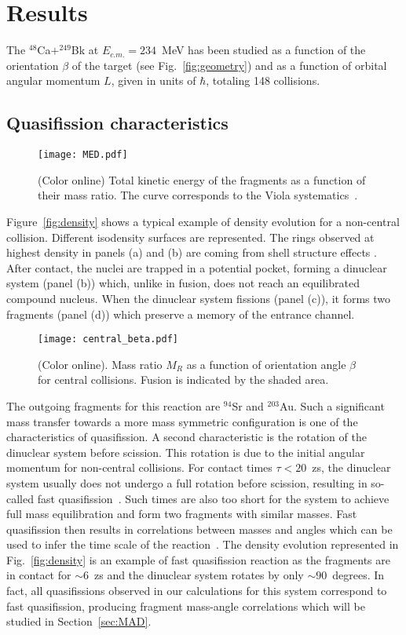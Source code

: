 \documentclass[reprint,aps,prc,twocolumn,floatfix,10pt]{revtex4-2}
\begin{document}
\section{Results}\label{sec:results}

The $^{48}$Ca$+^{249}$Bk at $E_{c.m.}=234$~MeV has been studied as a function of the orientation $\beta$ of the target (see Fig.~\ref{fig:geometry}) and as a function of orbital angular momentum $L$, given in units of $\hbar$, totaling 148 collisions.

\subsection{Quasifission characteristics}
\begin{figure}[!htb]
\texttt{[image: MED.pdf]}
\caption{\protect(Color online) Total kinetic energy of the fragments as a function of their mass ratio. The curve corresponds to the Viola systematics~\cite{viola1985,hinde1987}.}
\label{fig:MED}
\end{figure}

Figure~\ref{fig:density} shows a typical example of density evolution for a non-central collision.
Different isodensity surfaces are represented.
The rings observed at highest density in panels (a) and (b) are coming from shell structure effects \cite{simenel2012}.
After contact, the nuclei are trapped in a potential pocket, forming a dinuclear system (panel (b)) which, unlike in fusion, does not reach an equilibrated compound nucleus.
When the dinuclear system fissions (panel (c)), it forms two fragments (panel (d)) which preserve a memory of the entrance channel.
\begin{figure}[!htb]
\texttt{[image: central\_beta.pdf]}
\caption{\protect(Color online). Mass ratio $M_R$ as a function of orientation angle $\beta$ for central collisions. Fusion is indicated by the shaded area. }
\label{fig:central_beta}
\end{figure}

The outgoing fragments for this reaction are $^{94}$Sr and $^{203}$Au.
Such a significant mass transfer towards a more mass symmetric configuration is one of the characteristics of quasifission.
A second characteristic is the rotation of the dinuclear system before scission.
This rotation is due to the initial angular momentum for non-central collisions.
For contact times $\tau<20$~zs, the dinuclear system usually does not undergo a full rotation before scission, resulting in so-called fast quasifission~\cite{durietz2013,hinde2018}.
Such times are also too short for the system to achieve full mass equilibration and form two fragments with similar masses.
Fast quasifission then results in correlations between masses and angles which can be used to infer the time scale of the reaction~\cite{toke1985,durietz2011}.
The density evolution represented in Fig.~\ref{fig:density} is an example of fast quasifission reaction as the fragments are
in contact for $\sim6$~zs and the dinuclear system rotates by only $\sim90$~degrees.
In fact, all quasifissions observed in our calculations for this system correspond to fast quasifission, producing fragment mass-angle correlations which will be studied in Section~\ref{sec:MAD}.
\end{document}
